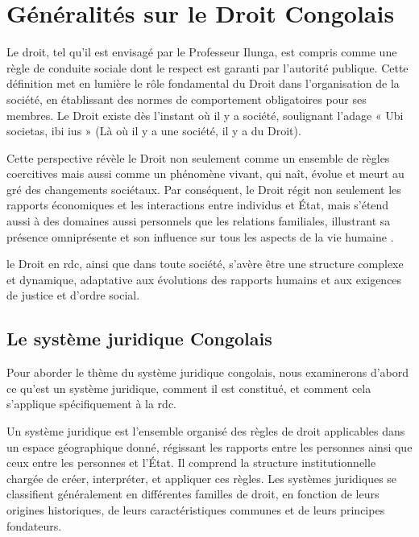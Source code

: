 \newpage
\section{Généralités sur le Droit Congolais}
\label{ch:1:section:introduction-law}

Le droit, tel qu'il est envisagé par le Professeur Ilunga, est compris comme une règle de conduite sociale dont le respect est garanti par l'autorité publique. Cette définition met en lumière le rôle fondamental du Droit dans l'organisation de la société, en établissant des normes de comportement obligatoires pour ses membres. Le Droit existe dès l'instant où il y a société, soulignant l'adage « Ubi societas, ibi ius » (Là où il y a une société, il y a du Droit).

Cette perspective révèle le Droit non seulement comme un ensemble de règles coercitives mais aussi comme un phénomène vivant, qui naît, évolue et meurt au gré des changements sociétaux. Par conséquent, le Droit régit non seulement les rapports économiques et les interactions entre individus et État, mais s'étend aussi à des domaines aussi personnels que les relations familiales, illustrant sa présence omniprésente et son influence sur tous les aspects de la vie humaine .

le Droit en \ac{rdc}, ainsi que dans toute société, s'avère être une structure complexe et dynamique, adaptative aux évolutions des rapports humains et aux exigences de justice et d'ordre social.

\subsection{Le système juridique Congolais}
Pour aborder le thème du système juridique congolais, nous examinerons d'abord ce qu'est un système juridique, comment il est constitué, et comment cela s'applique spécifiquement à la \acf{rdc}. 

Un système juridique est l'ensemble organisé des règles de droit applicables dans un espace géographique donné, régissant les rapports entre les personnes ainsi que ceux entre les personnes et l'État. Il comprend la structure institutionnelle chargée de créer, interpréter, et appliquer ces règles. Les systèmes juridiques se classifient généralement en différentes familles de droit, en fonction de leurs origines historiques, de leurs caractéristiques communes et de leurs principes fondateurs.

